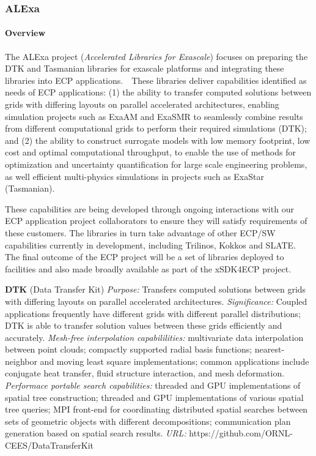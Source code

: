 
\subsubsection{ALExa} 


\paragraph{Overview} 

The ALExa project ({\sl Accelerated Libraries for
Exascale})
focuses on preparing the DTK and Tasmanian libraries for
exascale platforms and integrating these libraries into ECP
applications.  These libraries deliver capabilities
identified as needs of ECP applications: (1) the ability to
transfer computed solutions between grids with differing
layouts on parallel accelerated architectures,
enabling simulation projects such as ExaAM and ExaSMR to
seamlessly combine results from different computational
grids to perform their required simulations (DTK); and (2) the
ability to construct surrogate models with low memory
footprint, low cost and optimal computational throughput, to
enable the use of methods for optimization and uncertainty
quantification for large scale engineering problems, as well
efficient multi-physics simulations in projects such as
ExaStar (Tasmanian).

These capabilities
are being developed through ongoing interactions with our
ECP application project collaborators to ensure they will
satisfy requirements of these customers.  The libraries in
turn take advantage of other ECP/SW capabilities currently in
development, including Trilinos, Kokkos and SLATE.  The
final outcome of the ECP project will be a set of
libraries deployed to facilities
and also made broadly available as part of the xSDK4ECP
project.

{\bf DTK} (Data Transfer Kit)
{\it Purpose:}
Transfers computed solutions between grids with differing
layouts on parallel accelerated architectures.
{\it Significance:} Coupled applications frequently have
different grids with different parallel distributions; DTK
is able to transfer solution values between these grids
efficiently and accurately.
{\it Mesh-free interpolation capabililities:}
multivariate data interpolation between point clouds;
compactly supported radial basis functions;
nearest-neighbor and moving least square implementations;
common applications include conjugate heat transfer,
fluid structure interaction, and mesh deformation.
{\it Performace portable search capabilities:}
threaded and GPU implementations of spatial tree
construction;
threaded and GPU implementations of various spatial tree
queries;
MPI front-end for coordinating distributed spatial searches
between sets of geometric objects with different
decompositions;
communication plan generation based on spatial search
results.
{\it URL:}
https://github.com/ORNL-CEES/DataTransferKit

